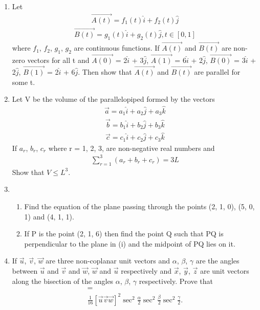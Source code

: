 \begin{enumerate}[label=\arabic*.,ref=\thesubsection.\theenumi]
\item Let 
\begin{align*}
\overrightarrow{A(t)} = f_1(t)\hat{i} + f_2(t)\hat{j}
\end{align*}
\begin{align*}
\overrightarrow{B(t)} = g_1(t)\hat{i} + g_2(t)\hat{j}, t \in [0,1]
\end{align*}
where $f_1$, $f_2$, $g_1$, $g_2$ are continuous functions. If $\overrightarrow{A(t)}$ and $\overrightarrow{B(t)}$ are non-zero vectors for all t and $\overrightarrow{A(0)}$ = 2$\hat{i}$ + 3$\hat{j}$, $\overrightarrow{A(1)}$ = 6$\hat{i}$ + 2$\hat{j}$, $\overrightarrow{B(0)}$ = 3$\hat{i}$ + 2$\hat{j}$, 
$\overrightarrow{B(1)}$ = 2$\hat{i}$ + 6$\hat{j}$. Then show that $\overrightarrow{A(t)}$ and $\overrightarrow{B(t)}$ are parallel for some t.

\item Let V be the volume of the parallelopiped formed by the vectors
\begin{align*}
\overrightarrow{a} = a_1\hat{i} + a_2\hat{j} + a_3\hat{k}
\end{align*}
\begin{align*}
\overrightarrow{b} = b_1\hat{i} + b_2\hat{j} + b_3\hat{k}
\end{align*}
\begin{align*}
\overrightarrow{c} = c_1\hat{i} + c_2\hat{j} + c_3\hat{k}
\end{align*}
If $a_r$, $b_r$, $c_r$ where r = 1, 2, 3, are non-negative real numbers and 
\begin{align*}
\sum_{r=1}^{3}(a_r + b_r + c_r)=3L
\end{align*}
Show that $V \leq L^{3}$.

\item 
\begin{enumerate}
\item Find the equation of the plane passing through the points (2, 1, 0), (5, 0, 1) and (4, 1, 1).
\item If P is the point (2, 1, 6) then find the point Q such that PQ is perpendicular to the plane in (i) and the midpoint of PQ lies on it.
\end{enumerate}

\item If $\overrightarrow{u}$, $\overrightarrow{v}$, $\overrightarrow{w}$ are three non-coplanar unit vectors and $\alpha$, $\beta$, $\gamma$ are the angles between $\overrightarrow{u}$ and $\overrightarrow{v}$ and $\overrightarrow{w}$, $\overrightarrow{w}$ and $\overrightarrow{u}$ respectively and $\overrightarrow{x}$, $\overrightarrow{y}$, $\overrightarrow{z}$ are unit vectors along the bisection of the angles $\alpha$, $\beta$, $\gamma$ respectively. Prove that
\begin{align*}
[(\overrightarrow{x} \times \overrightarrow{y})  (\overrightarrow{y} \times \overrightarrow{z}) (\overrightarrow{z} \times \overrightarrow{x})] =\\
\frac{1}{16}[\overrightarrow{u}\overrightarrow{v}\overrightarrow{w}]^{2} \sec^{2}\frac{\alpha}{2}\sec^{2}\frac{\beta}{2}\sec^{2}\frac{\gamma}{2}.
\end{align*}


\end{enumerate}
